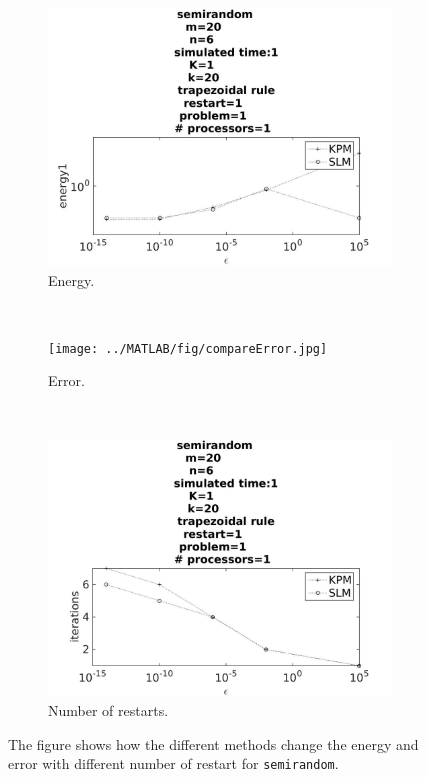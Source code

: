 \begin{figure}[H]
        \centering
        \begin{subfigure}[b]{0.3\textwidth}
                \includegraphics[width=\textwidth]{../MATLAB/fig/compareEnergy.jpg}
                \caption{Energy.}
                \label{fig:compareEnergy}
        \end{subfigure}
        ~
        \begin{subfigure}[b]{0.3\textwidth}
                \texttt{[image: ../MATLAB/fig/compareError.jpg]}
                \caption{ Error. }
                \label{fig:compareError}
        \end{subfigure}
        ~
        \begin{subfigure}[b]{0.3\textwidth}
                \includegraphics[width=\textwidth]{../MATLAB/fig/compareIter.jpg}
                \caption{ Number of restarts.  }
                \label{fig:compareIter}
        \end{subfigure}
        \caption{ The figure shows how the different methods change the energy and error with different number of restart for \texttt{semirandom}.  }
        \label{fig:compare}
\end{figure}


